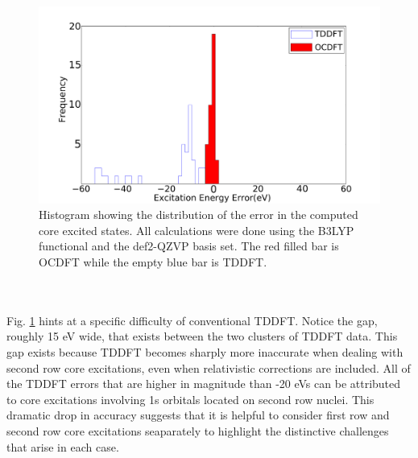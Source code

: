\documentclass[11.5pt]{article}
\begin{document}
\begin{figure}[!ht]
\includegraphics[scale=0.17]{TDDFT_OCDFT_histogram.pdf}
\caption{Histogram showing the distribution of the error in the computed core excited states. All calculations were done using the B3LYP functional and the def2-QZVP basis set. The red filled bar is OCDFT while the empty blue bar is TDDFT.}
\label{figure:Hist}
\end{figure}
\\ \\
Fig. \ref{figure:Hist} hints at a specific difficulty of conventional TDDFT. Notice the gap, roughly 15 eV wide, that exists between the two clusters of TDDFT data. This gap exists because TDDFT becomes sharply more inaccurate when dealing with second row core excitations, even when relativistic corrections are included. All of the TDDFT errors that are higher in magnitude than -20 eVs can be attributed to core excitations involving 1s orbitals located on second row nuclei. This dramatic drop in accuracy suggests that it is helpful to consider first row and second row core excitations seaparately to highlight the distinctive challenges that arise in each case.
\end{document}
